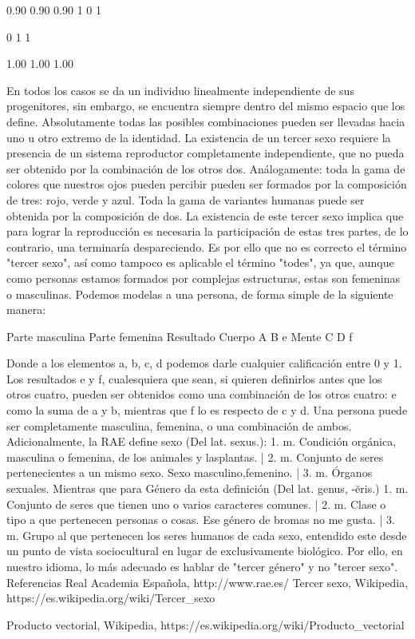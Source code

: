 0.90
0.90
0.90
1
0
1

0
1
1

1.00
1.00
1.00

En todos los casos se da un individuo linealmente independiente de sus progenitores, sin embargo, se encuentra siempre dentro del mismo espacio que los define.
                Absolutamente todas las posibles combinaciones pueden ser llevadas hacia uno u otro extremo de la identidad. La existencia de un tercer sexo requiere la presencia de un sistema reproductor completamente independiente, que no pueda ser obtenido por la combinación de los otros dos.
                Análogamente: toda la gama de colores que nuestros ojos pueden percibir pueden ser formados por la composición de tres: rojo, verde y azul. Toda la gama de variantes humanas puede ser obtenida por la composición de dos. La existencia de este tercer sexo implica que para lograr la reproducción es necesaria la participación de estas tres partes, de lo contrario, una terminaría despareciendo.
                Es por ello que no es correcto el término "tercer sexo", así como tampoco es aplicable el término "todes", ya que, aunque como personas estamos formados por complejas estructuras, estas son femeninas o masculinas. Podemos modelas a una persona, de forma simple de la siguiente manera: 

Parte masculina
Parte femenina
Resultado
Cuerpo
A
B
e
Mente
C
D
f

Donde a los elementos {a, b, c, d} podemos darle cualquier calificación entre 0 y 1. Los resultados e y f, cualesquiera que sean, si quieren definirlos antes que los otros cuatro, pueden ser obtenidos como una combinación de los otros cuatro: e como la suma de a y b, mientras que f lo es respecto de c y d. Una persona puede ser completamente masculina, femenina, o una combinación de ambos.
Adicionalmente, la RAE define sexo (Del lat. sexus.): 1. m. Condición orgánica, masculina o femenina, de los animales y lasplantas. | 2. m. Conjunto de seres pertenecientes a un mismo sexo. Sexo masculino,femenino. | 3. m. Órganos sexuales.
Mientras que para Género da esta definición (Del lat. genus, -ĕris.) 1. m. Conjunto de seres que tienen uno o varios caracteres comunes. | 2. m. Clase o tipo a que pertenecen personas o cosas. Ese género de bromas no me gusta. | 3. m. Grupo al que pertenecen los seres humanos de cada sexo, entendido este desde un punto de vista sociocultural en lugar de exclusivamente biológico.
Por ello, en nuestro idioma, lo más adecuado es hablar de "tercer género" y no "tercer sexo".
Referencias
Real Academia Española, http://www.rae.es/
Tercer sexo, Wikipedia, https://es.wikipedia.org/wiki/Tercer_sexo

Producto vectorial, Wikipedia, https://es.wikipedia.org/wiki/Producto_vectorial
